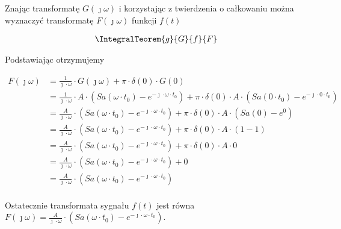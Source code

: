 \begin{task}
Znając transformatę $G(\jmath \omega)$ i korzystając z twierdzenia o całkowaniu można wyznaczyć transformatę $F(\jmath \omega)$ funkcji $f(t)$

\begin{align*}
\IntegralTeorem{g}{G}{f}{F}
\end{align*}
 
 Podstawiając otrzymujemy
 
\begin{align*}
F(\jmath \omega) &= \frac{1}{\jmath \cdot \omega} \cdot G(\jmath \omega) + \pi \cdot \delta(0) \cdot G(0)\\
&=\frac{1}{\jmath \cdot \omega} \cdot A \cdot \left( Sa\left( \omega \cdot t_0\right) - e^{-\jmath \cdot \omega \cdot t_0} \right) + \pi \cdot \delta(0) \cdot A \cdot \left( Sa\left( 0 \cdot t_0\right) - e^{-\jmath \cdot 0 \cdot t_0} \right)\\
&=\frac{A}{\jmath \cdot \omega} \cdot \left( Sa\left( \omega \cdot t_0\right) - e^{-\jmath \cdot \omega \cdot t_0} \right) + \pi \cdot \delta(0) \cdot A \cdot \left( Sa\left( 0 \right) - e^{0} \right)\\
&=\frac{A}{\jmath \cdot \omega} \cdot \left( Sa\left( \omega \cdot t_0\right) - e^{-\jmath \cdot \omega \cdot t_0} \right) + \pi \cdot \delta(0) \cdot A \cdot \left( 1 - 1 \right)\\
&=\frac{A}{\jmath \cdot \omega} \cdot \left( Sa\left( \omega \cdot t_0\right) - e^{-\jmath \cdot \omega \cdot t_0} \right) + \pi \cdot \delta(0) \cdot A \cdot 0\\
&=\frac{A}{\jmath \cdot \omega} \cdot \left( Sa\left( \omega \cdot t_0\right) - e^{-\jmath \cdot \omega \cdot t_0} \right) + 0\\
&=\frac{A}{\jmath \cdot \omega} \cdot \left( Sa\left( \omega \cdot t_0\right) - e^{-\jmath \cdot \omega \cdot t_0} \right)\\
\end{align*}


Ostatecznie transformata sygnału $f(t)$ jest równa $F(\jmath \omega)=\frac{A}{\jmath \cdot \omega} \cdot \left( Sa\left( \omega \cdot t_0\right) - e^{-\jmath \cdot \omega \cdot t_0} \right)$.


\end{task}

